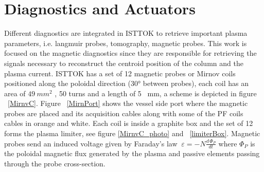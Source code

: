 \section{Diagnostics and Actuators}

Different  diagnostics are integrated in ISTTOK to retrieve important plasma parameters, i.e. langmuir probes, tomography, magnetic probes. This work is focused on the magnetic diagnostics  since they are responsible for  retrieving the signals necessary to reconstruct the centroid position of the column and the plasma current. ISTTOK has a set of 12  magnetic  probes or Mirnov coils positioned along the poloidal direction (30° between  probes), each coil has an area of $49 ~mm^2$ , 50 turns and a length of 5 ~mm, a scheme is depicted in figure ~\ref{MirnvC}. Figure ~\ref{MirnPort} shows the vessel side port where the magnetic probes are  placed and its acquisition cables along with some of the PF coils cables in orange and white. Each coil is inside a graphite box and the set of 12 forms the plasma limiter, see figure \ref{MirnvC_photo} and ~\ref{limiterBox}. Magnetic probes send an induced voltage given by Faraday's law $~\varepsilon = -N\frac{d\,\Phi_P}{dt}$ where $\Phi_P$ is the poloidal magnetic flux generated by the plasma and passive elements passing through the probe cross-section.
\smallskip




